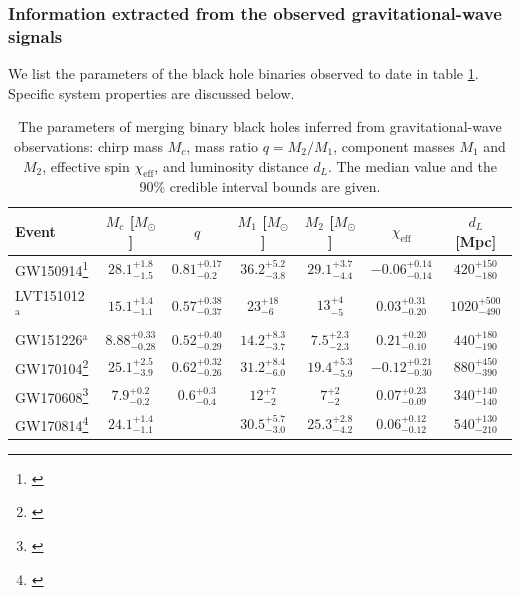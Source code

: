 \documentclass[iop,onecolumn]{revtex4-1}
\begin{document}
\subsubsection{Information extracted from the observed gravitational-wave signals}
We list the parameters of the black hole binaries observed to date in table \ref{table:BHmasses}. Specific system properties are discussed below.

\begin{table}
\begin{tabular}{lcccccc}
Event  & $M_c$ [$M_\odot$]  & $q$ & $M_1$ [$M_\odot$]  & $M_2$ [$M_\odot$]  & $\chi_\textrm{eff}$ & $d_L$ [Mpc] \\
\hline
GW150914\footnote{\citet{BBH:O1}} & $28.1^{+1.8}_{-1.5}$ & $0.81^{+0.17}_{-0.2}$ & $36.2^{+5.2}_{-3.8}$ & $29.1^{+3.7}_{-4.4}$ & $-0.06^{+0.14}_{-0.14}$ & $420^{+150}_{-180}$\\
LVT151012$^\mathrm{a}$ & $15.1^{+1.4}_{-1.1}$ &$0.57^{+0.38}_{-0.37}$ &$23^{+18}_{-6}$ &$13^{+4}_{-5}$ &$0.03^{+0.31}_{-0.20}$ &$1020^{+500}_{-490}$\\
GW151226$^\mathrm{a}$ & $8.88^{+0.33}_{-0.28}$ &$0.52^{+0.40}_{-0.29}$ &$14.2^{+8.3}_{-3.7}$ &$7.5^{+2.3}_{-2.3}$ &$0.21^{+0.20}_{-0.10}$ &$440^{+180}_{-190}$ \\
GW170104\footnote{\citet{GW170104}} & $25.1^{+2.5}_{-3.9}$ &$0.62^{+0.32}_{-0.26}$ &$31.2^{+8.4}_{-6.0}$ &$19.4^{+5.3}_{-5.9}$ &$-0.12^{+0.21}_{-0.30}$ &$880^{+450}_{-390}$\\
GW170608\footnote{\citet{GW170608}} & $7.9^{+0.2}_{-0.2}$ &$0.6^{+0.3}_{-0.4}$ &$12^{+7}_{-2}$ &$7^{+2}_{-2}$ &$0.07^{+0.23}_{-0.09}$ &$340^{+140}_{-140}$ \\
GW170814\footnote{\citet{GW170814}} & $24.1^{+1.4}_{-1.1}$ & &$30.5^{+5.7}_{-3.0}$ &$25.3^{+2.8}_{-4.2}$ &$0.06^{+0.12}_{-0.12}$ & $540^{+130}_{-210}$ \\
\hline
\end{tabular}
\caption{The parameters of merging binary black holes inferred from gravitational-wave observations: chirp mass $M_c$, mass ratio $q=M_2/M_1$, component masses $M_1$ and $M_2$, effective spin $\chi_\textrm{eff}$, and luminosity distance $d_L$.  The median value and the 90\% credible interval bounds are given.}\label{table:BHmasses}
\end{table}
\end{document}
